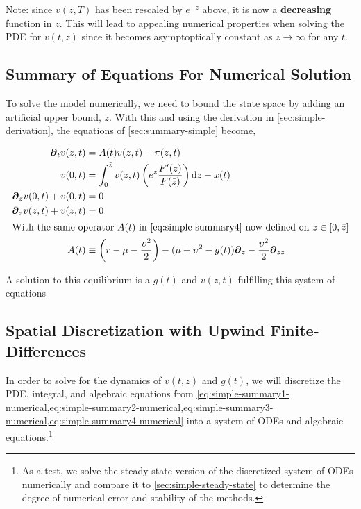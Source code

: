 \documentclass[11pt]{article}
\newcommand{\D}[1][]{\ensuremath{\boldsymbol{\partial}_{#1}}}
\newcommand{\diff}{\ensuremath{\mathrm{d}}}
\begin{document}
Note: since $v(z,T)$ has been rescaled by $e^{-z}$ above, it is now a \textbf{decreasing} function in $z$.  This will lead to appealing numerical properties when solving the PDE for $v(t,z)$ since it becomes asymptoptically constant as $z \to \infty$ for any $t$.


\subsection{Summary of Equations For Numerical Solution}\label{sec:summary-simple-numerical}
To solve the model numerically, we need to bound the state space by adding an artificial upper bound, $\bar{z}$.  With this and using the derivation in \cref{sec:simple-derivation}, the equations of \cref{sec:summary-simple} become,

\begin{align}
\D[t]v(z,t) &= A(t)v(z,t) - \pi(z,t)\label{eq:simple-summary1-numerical}\\
v(0,t) &= \int_{0}^{\bar{z}}  v(z,t) \left(e^z \frac{F'(z)}{F(\bar{z})}\right) \diff z - x(t)\label{eq:simple-summary2-numerical}\\
\D[z]v(0,t) + v(0,t) &= 0\label{eq:simple-summary3-numerical}\\
\D[z]v(\bar{z},t) + v(\bar{z},t) &= 0\label{eq:simple-summary4-numerical}\\
\intertext{With the same operator $A(t)$ in \cref{eq:simple-summary4} now defined on $z \in [0,\bar{z}]$}
A(t) &\equiv \left(r - \mu - \frac{\upsilon^2}{2}\right) - (\mu+ \upsilon^2 - g(t)) \D[z] - \frac{\upsilon^2}{2} \D[zz]\label{eq:simple-summary5-numerical}
\end{align}

\noindent A solution to this equilibrium is a $g(t)$ and $v(z,t)$ fulfilling this system of equations

\subsection{Spatial Discretization with Upwind Finite-Differences}

In order to solve for the dynamics of $v(t,z)$ and $g(t)$, we will discretize the PDE, integral, and algebraic equations from \cref{eq:simple-summary1-numerical,eq:simple-summary2-numerical,eq:simple-summary3-numerical,eq:simple-summary4-numerical} into a system of ODEs and algebraic equations.\footnote{As a test, we solve the steady state version of the discretized system of ODEs numerically and compare it to \cref{sec:simple-steady-state} to determine the degree of numerical error and stability of the methods.}
\end{document}
